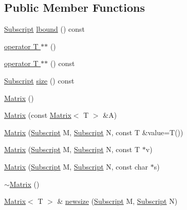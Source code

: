 \subsection*{Public Member Functions}
\begin{DoxyCompactItemize}
\item 
\hyperlink{namespaceTNT_af22e3f1460e145c04ce4e7d701e4c1c1}{Subscript} \hyperlink{classTNT_1_1Matrix_abc5f4f03814ac773f393711881e65536}{lbound} () const 
\item 
\hyperlink{classTNT_1_1Matrix_a38cbed657ebe06ea5767fcb593aa2bbf}{operator T $\ast$$\ast$} ()
\item 
\hyperlink{classTNT_1_1Matrix_aba9b50ec4591ab67cc759e858429f368}{operator T $\ast$$\ast$} () const 
\item 
\hyperlink{namespaceTNT_af22e3f1460e145c04ce4e7d701e4c1c1}{Subscript} \hyperlink{classTNT_1_1Matrix_aef58599b7a9dc39061b94007a3f71c00}{size} () const 
\item 
\hyperlink{classTNT_1_1Matrix_a38e705abbbd5155756241db959bae662}{Matrix} ()
\item 
\hyperlink{classTNT_1_1Matrix_aa6cd1bfe3ede4545d0e6693a443b50f1}{Matrix} (const \hyperlink{classTNT_1_1Matrix}{Matrix}$<$ T $>$ \&A)
\item 
\hyperlink{classTNT_1_1Matrix_ae79fec5ae7648b9971523bcc123af764}{Matrix} (\hyperlink{namespaceTNT_af22e3f1460e145c04ce4e7d701e4c1c1}{Subscript} M, \hyperlink{namespaceTNT_af22e3f1460e145c04ce4e7d701e4c1c1}{Subscript} N, const T \&value=T())
\item 
\hyperlink{classTNT_1_1Matrix_ac66034c440243c8ff299c0c0774ad82d}{Matrix} (\hyperlink{namespaceTNT_af22e3f1460e145c04ce4e7d701e4c1c1}{Subscript} M, \hyperlink{namespaceTNT_af22e3f1460e145c04ce4e7d701e4c1c1}{Subscript} N, const T $\ast$v)
\item 
\hyperlink{classTNT_1_1Matrix_a4f19bfddcd8e952d7709d3d4b969bd44}{Matrix} (\hyperlink{namespaceTNT_af22e3f1460e145c04ce4e7d701e4c1c1}{Subscript} M, \hyperlink{namespaceTNT_af22e3f1460e145c04ce4e7d701e4c1c1}{Subscript} N, const char $\ast$s)
\item 
\hyperlink{classTNT_1_1Matrix_ac3cd6db0fe4b5aecd460c99b8a456aae}{$\sim$\-Matrix} ()
\item 
\hyperlink{classTNT_1_1Matrix}{Matrix}$<$ T $>$ \& \hyperlink{classTNT_1_1Matrix_a2fa0b7e3924a7a51d2973b93b698aa05}{newsize} (\hyperlink{namespaceTNT_af22e3f1460e145c04ce4e7d701e4c1c1}{Subscript} M, \hyperlink{namespaceTNT_af22e3f1460e145c04ce4e7d701e4c1c1}{Subscript} N)
\item 

\end{DoxyCompactItemize}
